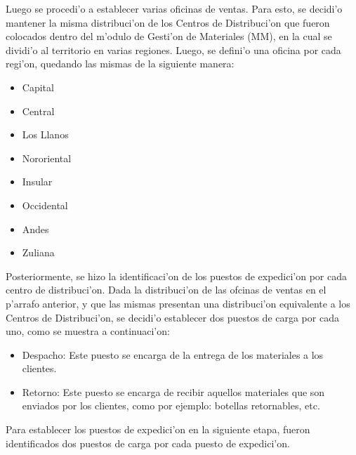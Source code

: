 Luego se procedi'o a establecer varias oficinas de ventas. Para esto, se decidi'o mantener la misma distribuci'on de los Centros de Distribuci'on que fueron colocados dentro del m'odulo de Gesti'on de Materiales (MM), en la cual se dividi'o al territorio en varias regiones. Luego, se defini'o una oficina por cada regi'on, quedando las mismas de la siguiente manera:
\begin{itemize}
\item Capital
\item Central
\item Los Llanos
\item Nororiental
\item Insular
\item Occidental
\item Andes
\item Zuliana
\end{itemize}
	Posteriormente, se hizo la identificaci'on de los puestos de expedici'on por cada centro de distribuci'on. Dada la distribuci'on de las ofcinas de ventas en el p'arrafo anterior, y que las mismas presentan una distribuci'on equivalente a los Centros de Distribuci'on, se decidi'o establecer dos puestos de carga por cada uno, como se muestra a continuaci'on:
\begin{itemize}
\item Despacho: Este puesto se encarga de la entrega de los materiales a los clientes.
\item Retorno: Este puesto se encarga de recibir aquellos materiales que son enviados por los clientes, como por ejemplo: botellas retornables, etc.
\end{itemize}
	Para establecer los puestos de expedici'on en la siguiente etapa, fueron identificados dos puestos de carga por cada puesto de expedici'on.
